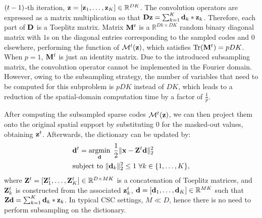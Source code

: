 $(t-1)$-th iteration, $\code = [\code_1, \dots, \code_K] \in
\mathbb{R}^{DK}$. The convolution operators are expressed as a matrix
multiplication so that $ \Filter \code = \sum_{k=1}^{K} \filter_k *
\code_k$. Therefore, each part of $\Filter$ is a Toeplitz
matrix. Matrix $\mask^{\ite}$ is a $\mathbb{R}^{Dk \times DK}$ random binary
diagonal matrix with $1$s on the diagonal entries corresponding to the sampled codes and $0$ elsewhere, performing the function of
$\mathcal{M}^{\ite}(\code)$, which satisfies $\mathrm{Tr}(\mask^{\ite}) = pDK$. When $p=1$, $\mask^{\ite}$ is just an identity matrix.
Due to the introduced subsampling matrix, the
convolution operator cannot be implemented in the Fourier
domain. However, owing to the subsampling
strategy, the number of variables that need to be computed for this
subproblem is $pDK$ instead of $DK$, which leads to a reduction
of the spatial-domain computation time by a factor of $\frac{1}{p}$.

After computing the subsampled sparse codes $\mathcal{M}^{\ite}(\code)$, we can then project them
onto the original spatial support by substituting $0$ for the
masked-out values, obtaining $\code^{\ite}$. Afterwards, the dictionary can be updated by:
\begin{equation} \label{eq:updatingFilter}
\begin{split}
   & \filter^{\ite} = \minimize{\filter} \frac{1}{2}\|\signal - \Code^{\ite} \filter \|_2^2 \\
   & \text{subject to}  ~ \|\filter_k\|^2_2 \leq 1 ~ \forall k \in \{1,\dots,K\},
\end{split}
\end{equation}
where $\Code^{\ite}= [\Code_1^{\ite}, \dots, \Code_K^{\ite}]
\in \mathbb{R}^{D \times MK}$ is a concatenation of Toeplitz matrices,
and $\Code_k^{\ite}$ is constructed from the associated $\code_k^{\ite}$, $\filter=
[\filter_1,\dots,\filter_K] \in \mathbb{R}^{MK}$ such that $ \Code
\filter = \sum_{k=1}^{K} \filter_k * \code_k$. In typical CSC
settings, $M \ll D$, hence there is no need to perform subsampling on
the dictionary.

